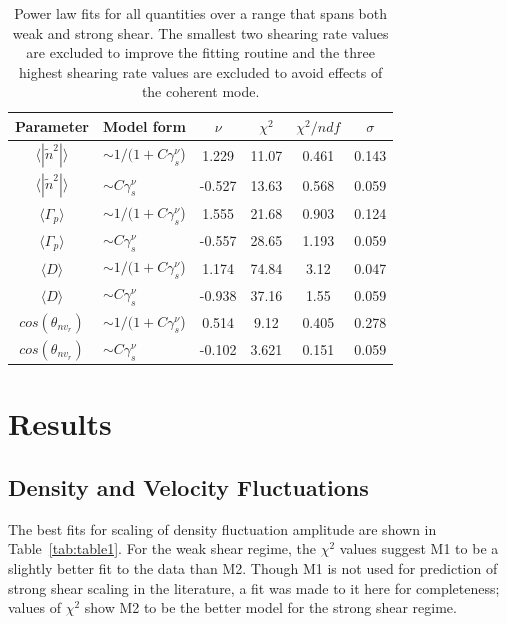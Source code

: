 \documentclass[aip,pop,amsmath,amssymb,preprint,superscriptaddress]{revtex4-1} %
\begin{document}
\begin{table}
\caption{\label{tab:table7}Power law fits for all quantities over a
  range that spans both weak and strong shear. The smallest two
  shearing rate values are excluded to improve the fitting routine and
  the three highest shearing rate values are excluded to avoid effects of the coherent mode.}
\begin{ruledtabular}
\begin{tabular}{clcccc}
Parameter&Model form&$\nu$&$\chi^2$&$\chi^2/ndf$&$\sigma$\\
\hline
$\langle |\tilde{n}^{2}|\rangle$     & $\sim 1/(1+C\gamma_{s}^\nu$) &1.229    &11.07     &0.461   &0.143\\
$\langle |\tilde{n}^{2}|\rangle$     & $\sim C\gamma_{s}^\nu$       &-0.527   &13.63     &0.568   &0.059\\
$\langle \Gamma_{p}\rangle$          & $\sim 1/(1+C\gamma_{s}^\nu$) &1.555    &21.68     &0.903   &0.124\\
$\langle \Gamma_{p}\rangle$          & $\sim C\gamma_{s}^\nu$       &-0.557   &28.65     &1.193   &0.059\\
$\langle D\rangle$                   & $\sim 1/(1+C\gamma_{s}^\nu$) &1.174    &74.84     &3.12    &0.047\\
$\langle D\rangle$                   & $\sim C\gamma_{s}^\nu$       &-0.938   &37.16     &1.55    &0.059\\
$cos(\theta_{nv_{r}})$               & $\sim 1/(1+C\gamma_{s}^\nu$) &0.514    &9.12      &0.405   &0.278\\
$cos(\theta_{nv_{r}})$               & $\sim C\gamma_{s}^\nu$       &-0.102   &3.621     &0.151   &0.059\\

\end{tabular}
\end{ruledtabular}
\end{table}

\section{Results}

\subsection{Density and Velocity Fluctuations}

The best fits for scaling of density fluctuation amplitude are shown in Table~\ref{tab:table1}. For the weak shear regime, the $\chi^{2}$ values suggest M1 to be a slightly better fit to the data than M2. Though M1 is not used for prediction of strong shear scaling in the literature, a fit was made to it here for completeness; values of $\chi^{2}$ show M2 to be the better model for the strong shear regime.
\end{document}

